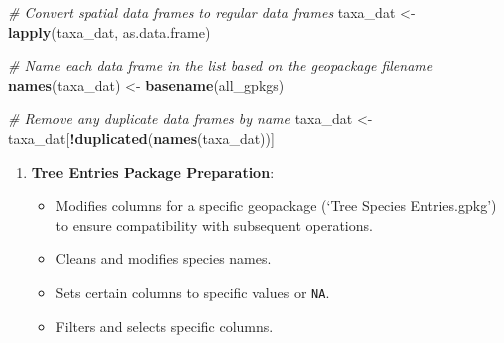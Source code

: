 \documentclass[
]{book}
\newenvironment{Shaded}{\begin{snugshade}}{\end{snugshade}}
\newcommand{\CommentTok}[1]{\textcolor[rgb]{0.56,0.35,0.01}{\textit{#1}}}
\newcommand{\FunctionTok}[1]{\textcolor[rgb]{0.13,0.29,0.53}{\textbf{#1}}}
\newcommand{\NormalTok}[1]{#1}
\newcommand{\OtherTok}[1]{\textcolor[rgb]{0.56,0.35,0.01}{#1}}
\newcommand{\SpecialCharTok}[1]{\textcolor[rgb]{0.81,0.36,0.00}{\textbf{#1}}}
\providecommand{\tightlist}{%
  \setlength{\itemsep}{0pt}\setlength{\parskip}{0pt}}
\theoremstyle{definition}
\theoremstyle{definition}
\theoremstyle{definition}
\theoremstyle{definition}
\theoremstyle{remark}
\begin{document}
\begin{Shaded}
\begin{Highlighting}[]
\CommentTok{\# Convert spatial data frames to regular data frames}
\NormalTok{taxa\_dat }\OtherTok{\textless{}{-}} \FunctionTok{lapply}\NormalTok{(taxa\_dat, as.data.frame)}

\CommentTok{\# Name each data frame in the list based on the geopackage filename}
\FunctionTok{names}\NormalTok{(taxa\_dat) }\OtherTok{\textless{}{-}} \FunctionTok{basename}\NormalTok{(all\_gpkgs)}

\CommentTok{\# Remove any duplicate data frames by name}
\NormalTok{taxa\_dat }\OtherTok{\textless{}{-}}\NormalTok{ taxa\_dat[}\SpecialCharTok{!}\FunctionTok{duplicated}\NormalTok{(}\FunctionTok{names}\NormalTok{(taxa\_dat))]}
\end{Highlighting}
\end{Shaded}

\begin{enumerate}
\def\labelenumi{\arabic{enumi}.}
\setcounter{enumi}{2}
\tightlist
\item
  \textbf{Tree Entries Package Preparation}:

  \begin{itemize}
  \tightlist
  \item
    Modifies columns for a specific geopackage (`Tree Species Entries.gpkg') to ensure compatibility with subsequent operations.
  \item
    Cleans and modifies species names.
  \item
    Sets certain columns to specific values or \texttt{NA}.
  \item
    Filters and selects specific columns.
  \end{itemize}
\end{enumerate}
\end{document}
